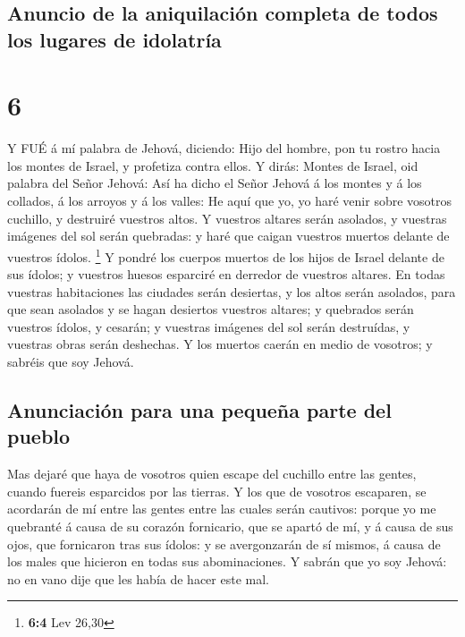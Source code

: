 \hypertarget{anuncio-de-la-aniquilaciuxf3n-completa-de-todos-los-lugares-de-idolatruxeda}{%
\subsection{Anuncio de la aniquilación completa de todos los lugares de
idolatría}\label{anuncio-de-la-aniquilaciuxf3n-completa-de-todos-los-lugares-de-idolatruxeda}}

\hypertarget{section-5}{%
\section{6}\label{section-5}}

 Y FUÉ á mí palabra de Jehová, diciendo:  Hijo
del hombre, pon tu rostro hacia los montes de Israel, y profetiza contra
ellos.  Y dirás: Montes de Israel, oid palabra del Señor
Jehová: Así ha dicho el Señor Jehová á los montes y á los collados, á
los arroyos y á los valles: He aquí que yo, yo haré venir sobre vosotros
cuchillo, y destruiré vuestros altos.  Y vuestros altares
serán asolados, y vuestras imágenes del sol serán quebradas: y haré que
caigan vuestros muertos delante de vuestros ídolos. \footnote{\textbf{6:4}
  Lev 26,30}  Y pondré los cuerpos muertos de los hijos de
Israel delante de sus ídolos; y vuestros huesos esparciré en derredor de
vuestros altares.  En todas vuestras habitaciones las
ciudades serán desiertas, y los altos serán asolados, para que sean
asolados y se hagan desiertos vuestros altares; y quebrados serán
vuestros ídolos, y cesarán; y vuestras imágenes del sol serán
destruídas, y vuestras obras serán deshechas.  Y los muertos
caerán en medio de vosotros; y sabréis que soy Jehová.

\hypertarget{anunciaciuxf3n-para-una-pequeuxf1a-parte-del-pueblo}{%
\subsection{Anunciación para una pequeña parte del
pueblo}\label{anunciaciuxf3n-para-una-pequeuxf1a-parte-del-pueblo}}

 Mas dejaré que haya de vosotros quien escape del cuchillo
entre las gentes, cuando fuereis esparcidos por las tierras.
 Y los que de vosotros escaparen, se acordarán de mí entre
las gentes entre las cuales serán cautivos: porque yo me quebranté á
causa de su corazón fornicario, que se apartó de mí, y á causa de sus
ojos, que fornicaron tras sus ídolos: y se avergonzarán de sí mismos, á
causa de los males que hicieron en todas sus abominaciones.
 Y sabrán que yo soy Jehová: no en vano dije que les había
de hacer este mal.

